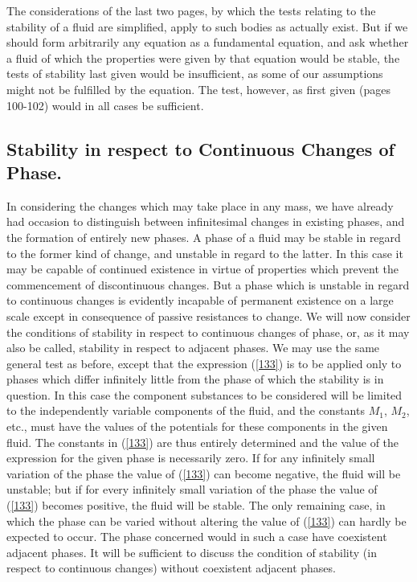 \documentclass[12pt]{article}
\begin{document}
The considerations of the last two pages, by which the tests relating to the stability of a fluid are simplified, apply to such bodies as actually exist. But if we should form arbitrarily any equation as a fundamental equation, and ask whether a fluid of which the properties were given by that equation would be stable, the tests of stability last given would be insufficient, as some of our assumptions might not be fulfilled by the equation. The test, however, as first given (pages 100-102) would in all cases be sufficient.
\subsection{Stability in respect to Continuous Changes of Phase.}
In considering the changes which may take place in any mass, we have already had occasion to distinguish between infinitesimal changes in existing phases, and the formation of entirely new phases. A phase of a fluid may be stable in regard to the former kind of change, and unstable in regard to the latter. In this case it may be capable of continued existence in virtue of properties which prevent the commencement of discontinuous changes. But a phase which is unstable in regard to continuous changes is evidently incapable of permanent existence on a large scale except in consequence of passive resistances to change. We will now consider the conditions of stability in respect to continuous changes of phase, or, as it may also be called, stability in respect to adjacent phases. We may use the same general test as before, except that the expression (\ref{133}) is to be applied only to phases which differ infinitely little from the phase of which the stability is in question. In this case the component substances to be considered will be limited to the independently variable components of the fluid, and the constants $M_1$, $M_2$, etc., must have the values of the potentials for these components in the given fluid. The constants in (\ref{133}) are thus entirely determined and the value of the expression for the given phase is necessarily zero. If for any infinitely small variation of the phase the value of (\ref{133}) can become negative, the fluid will be unstable; but if for every infinitely small variation of the phase the value of (\ref{133}) becomes positive, the fluid will be stable. The only remaining case, in which the phase can be varied without altering the value of (\ref{133}) can hardly be expected to occur. The phase concerned would in such a case have coexistent adjacent phases. It will be sufficient to discuss the condition of stability (in respect to continuous changes) without coexistent adjacent phases.
\end{document}
